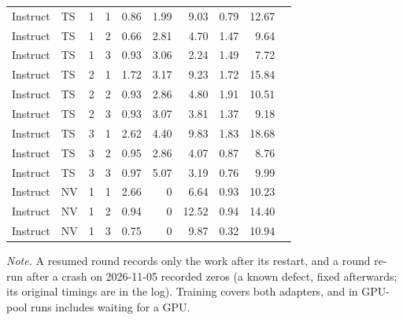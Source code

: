 {\begin{longtable}{@{}llccrrrrrl@{}}
Instruct & TS & 1 & 1 & 0.86 & 1.99 & 9.03 & 0.79 & 12.67 & \\
Instruct & TS & 1 & 2 & 0.66 & 2.81 & 4.70 & 1.47 & 9.64 & \\
Instruct & TS & 1 & 3 & 0.93 & 3.06 & 2.24 & 1.49 & 7.72 & \\
Instruct & TS & 2 & 1 & 1.72 & 3.17 & 9.23 & 1.72 & 15.84 & \\
Instruct & TS & 2 & 2 & 0.93 & 2.86 & 4.80 & 1.91 & 10.51 & \\
Instruct & TS & 2 & 3 & 0.93 & 3.07 & 3.81 & 1.37 & 9.18 & \\
Instruct & TS & 3 & 1 & 2.62 & 4.40 & 9.83 & 1.83 & 18.68 & \\
Instruct & TS & 3 & 2 & 0.95 & 2.86 & 4.07 & 0.87 & 8.76 & \\
Instruct & TS & 3 & 3 & 0.97 & 5.07 & 3.19 & 0.76 & 9.99 & \\
Instruct & NV & 1 & 1 & 2.66 & 0 & 6.64 & 0.93 & 10.23 & \\
Instruct & NV & 1 & 2 & 0.94 & 0 & 12.52 & 0.94 & 14.40 & \\
Instruct & NV & 1 & 3 & 0.75 & 0 & 9.87 & 0.32 & 10.94 & \\
\end{longtable}
}
\vspace{-0.6\baselineskip}
{\footnotesize\color{slate}\textit{Note.} A resumed round records only the work after its restart, and a round re-run after a crash on 2026-11-05 recorded zeros (a known defect, fixed afterwards; its original timings are in the log). Training covers both adapters, and in GPU-pool runs includes waiting for a GPU.\par}
\medskip
